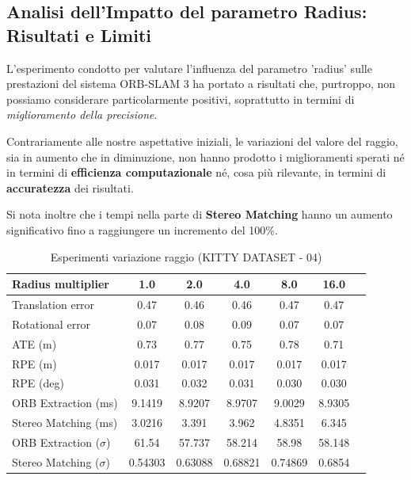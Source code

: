 \documentclass[12pt,a4paper]{report}
\begin{document}
\vspace{4cm}

\subsection{Analisi dell'Impatto del parametro Radius: Risultati e Limiti}

L'esperimento condotto per valutare l'influenza del parametro 'radius' sulle prestazioni del sistema ORB-SLAM 3 ha portato a risultati che, purtroppo, non possiamo considerare particolarmente positivi, soprattutto in termini di \textit{miglioramento della precisione}.

Contrariamente alle nostre aspettative iniziali, le variazioni del valore del raggio, sia in aumento che in diminuzione, non hanno prodotto i miglioramenti sperati né in termini di  \textbf{ efficienza computazionale} né, cosa più rilevante, in termini di \textbf{accuratezza} dei risultati.

Si nota inoltre che i tempi nella parte di \textbf{Stereo Matching} hanno un aumento significativo fino a raggiungere un incremento del 100\%.



\begin{table}[h]
    \centering
    \caption{Esperimenti variazione raggio (KITTY DATASET - 04) }
    \begin{tabular}{lcccccc}
        \toprule
        \rowcolor{gray!20}
        Radius multiplier & 1.0 & \cellcolor{orange!40}2.0 & 4.0 & 8.0 & 16.0 \\
        \midrule
        Translation error & 0.47 & \cellcolor{green!20}0.46 & \cellcolor{green!20}0.46 & 0.47 & 0.47 \\
        Rotational error  & \cellcolor{green!20}0.07 & 0.08 & 0.09 & \cellcolor{green!20}0.07 & \cellcolor{green!20}0.07 \\
        ATE (m)           & 0.73 & 0.77 & 0.75 & 0.78 & \cellcolor{green!20}0.71 \\
        RPE (m)           & \cellcolor{green!20}0.017 & \cellcolor{green!20}0.017 & \cellcolor{green!20}0.017 & \cellcolor{green!20}0.017 & \cellcolor{green!20}0.017 \\
        RPE (deg)         & 0.031 & 0.032 & 0.031 & \cellcolor{green!20}0.030 & \cellcolor{green!20}0.030 \\
        ORB Extraction (ms) & 9.1419 & \cellcolor{green!20}8.9207 & \cellcolor{green!20}8.9707 & 9.0029 & 8.9305 \\
        Stereo Matching (ms) & \cellcolor{green!20}3.0216 & 3.391 & 3.962 & 4.8351 & 6.345 \\
        ORB Extraction ($\sigma$) & 61.54 & \cellcolor{green!20}57.737 & 58.214 & 58.98 & 58.148 \\
        Stereo Matching ($\sigma$) & \cellcolor{green!20}0.54303 & 0.63088 & 0.68821 & 0.74869 & 0.6854 \\
        \bottomrule
    \end{tabular}
\end{table}
\end{document}
